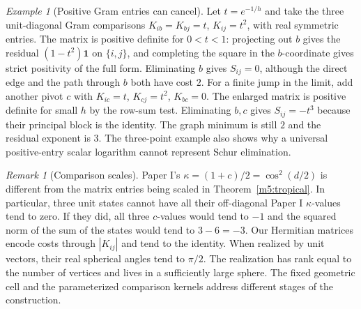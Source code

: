 \documentclass[11pt,reqno]{amsart}
\theoremstyle{definition}
\theoremstyle{remark}
\newtheorem{remark}[theorem]{Remark}
\newtheorem{example}[theorem]{Example}
\numberwithin{equation}{section}
\begin{document}
\begin{example}[Positive Gram entries can cancel]\label{m5:counter}
Let \(t=e^{-1/h}\) and take the three unit-diagonal Gram comparisons
\(K_{ib}=K_{bj}=t\), \(K_{ij}=t^2\), with real symmetric entries.
The matrix is positive definite for \(0<t<1\): projecting out \(b\)
gives the residual \((1-t^2)\mathbf 1\) on \(\{i,j\}\), and completing
the square in the \(b\)-coordinate gives strict positivity of the full
form. Eliminating \(b\) gives \(S_{ij}=0\), although the direct edge
and the path through \(b\) both have cost \(2\). For a finite jump in
the limit, add another pivot \(c\) with \(K_{ic}=t\), \(K_{cj}=t^2\),
\(K_{bc}=0\). The enlarged matrix is positive definite for small \(h\)
by the row-sum test. Eliminating \(b,c\) gives \(S_{ij}=-t^3\) because
their principal block is the identity. The graph minimum is still \(2\)
and the residual exponent is \(3\). The three-point example also shows
why a universal positive-entry scalar logarithm cannot represent
Schur elimination.
\end{example}

\begin{remark}[Comparison scales]\label{m5:scales-compatibility}
Paper I's \(\kappa=(1+c)/2=\cos^2(d/2)\) is different from the
matrix entries being scaled in Theorem~\ref{m5:tropical}. In particular,
three unit states cannot have all their off-diagonal Paper I
\(\kappa\)-values tend to zero. If they did, all three \(c\)-values
would tend to \(-1\) and the squared norm of the sum of the states
would tend to \(3-6=-3\). Our Hermitian matrices encode costs through
\(|K_{ij}|\) and tend to the identity. When realized by unit vectors,
their real spherical angles tend to \(\pi/2\). The realization has
rank equal to the number of vertices and lives in a sufficiently
large sphere. The fixed geometric cell and the parameterized
comparison kernels address different stages of the construction.
\end{remark}
\end{document}
